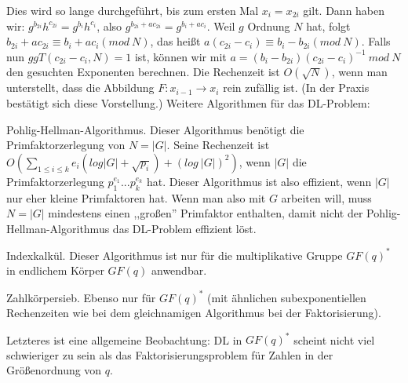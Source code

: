 \documentclass[a4paper]{article}
\begin{document}
\begin{multicols}{3}
    Dies wird so lange durchgeführt, bis zum ersten Mal $x_i=x_{2i}$ gilt. Dann haben wir: $g^{b_{2i}} h^{c_{2i}}=g^{b_i} h^{c_i}$, also $g^{b_{2i}+ac_{2i}}=g^{b_i+ac_i}$. Weil $g$ Ordnung $N$ hat, folgt $b_{2i} +ac_{2i}\equiv b_i+ac_i (mod\ N)$, das heißt $a(c_{2i}-c_i)\equiv b_i-b_{2i} (mod\ N)$.
    Falls nun $ggT(c_{2i}-c_i,N) = 1$ ist, können wir mit $a= (b_i-b_{2i})(c_{2i}-c_i)^{-1}\ mod\ N$ den gesuchten Exponenten berechnen.
    Die Rechenzeit ist $O(\sqrt{N})$, wenn man unterstellt, dass die Abbildung $F:x_{i-1}\rightarrow x_i$ rein zufällig ist. (In der Praxis bestätigt sich diese Vorstellung.)
    Weitere Algorithmen für das DL-Problem:
    \begin{itemize*}
        \item Pohlig-Hellman-Algorithmus. Dieser Algorithmus benötigt die Primfaktorzerlegung von $N=|G|$. Seine Rechenzeit ist $O(\sum_{1 \leq i\leq k} e_i(log|G|+\sqrt{p_i}) + (log\ |G|)^2)$, wenn $|G|$ die Primfaktorzerlegung $p^{e_1}_1... p^{e_k}_k$ hat. Dieser Algorithmus ist also effizient, wenn $|G|$ nur eher kleine Primfaktoren hat. Wenn man also mit $G$ arbeiten will, muss $N=|G|$ mindestens einen ,,großen'' Primfaktor enthalten, damit nicht der Pohlig-Hellman-Algorithmus das DL-Problem effizient löst.
        \item Indexkalkül. Dieser Algorithmus ist nur für die multiplikative Gruppe $GF(q)^*$ in endlichem Körper $GF(q)$ anwendbar.
        \item Zahlkörpersieb. Ebenso nur für $GF(q)^*$ (mit ähnlichen subexponentiellen Rechenzeiten wie bei dem gleichnamigen Algorithmus bei der Faktorisierung).
    \end{itemize*}

    Letzteres ist eine allgemeine Beobachtung: DL in $GF(q)^*$ scheint nicht viel schwieriger zu sein als das Faktorisierungsproblem für Zahlen in der Größenordnung von $q$.


\end{multicols}
\end{document}
